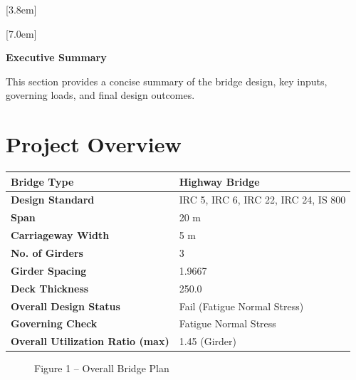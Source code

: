 \documentclass[12pt,a4paper]{report}
\numberwithin{table}{chapter}
\numberwithin{figure}{chapter}
\begin{document}
[3.8em]
  {\normalfont}
  {\contentslabel{2.3em}}
  {\hspace*{-2.3em}}
  {\hfill\contentspage}

[7.0em]
  {\normalfont}
  {\contentslabel{3.2em}}
  {\hspace*{-3.2em}}
  {\hfill\contentspage}

\newpage
\renewcommand{\contentsname}{\centering\Large\bfseries Table of Contents}
\tableofcontents


\newpage
{\centering\Large\bfseries Executive Summary\par}
\vspace{0.8em}

This section provides a concise summary of the bridge design, key inputs, governing loads, and final design outcomes.

\section*{Project Overview}
\label{sec:project-overview}


\begin{tabular}{|L{5.5cm}|L{8.5cm}|}
\hline
\textbf{Bridge Type} & Highway Bridge \\
\hline
\textbf{Design Standard} & IRC 5, IRC 6, IRC 22, IRC 24, IS 800 \\
\hline
\textbf{Span} & 20 m \\
\hline
\textbf{Carriageway Width} & 5 m \\
\hline
\textbf{No. of Girders} & 3 \\
\hline
\textbf{Girder Spacing} & 1.9667 \\
\hline
\textbf{Deck Thickness} & 250.0 \\
\hline
\textbf{Overall Design Status} & Fail (Fatigue Normal Stress) \\
\hline
\textbf{Governing Check} & Fatigue Normal Stress \\
\hline
\textbf{Overall Utilization Ratio (max)} & 1.45 (Girder) \\
\hline
\end{tabular}


\begin{figure}[H]
\centering
{}
\caption*{Figure 1 -- Overall Bridge Plan}
\end{figure}
\end{document}
